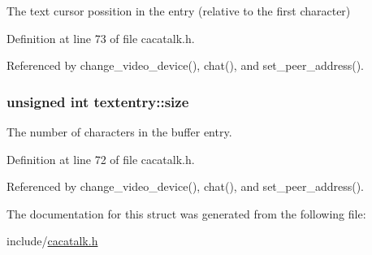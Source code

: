 \-The text cursor possition in the entry (relative to the first character) 



\-Definition at line 73 of file cacatalk.\-h.



\-Referenced by change\-\_\-video\-\_\-device(), chat(), and set\-\_\-peer\-\_\-address().

\hypertarget{structtextentry_a56e0baee961740d8bd5e0974e94af85a}{
\subsubsection[{size}]{\setlength{\rightskip}{0pt plus 5cm}unsigned int {\bf textentry\-::size}}}\label{structtextentry_a56e0baee961740d8bd5e0974e94af85a}


\-The number of characters in the buffer entry. 



\-Definition at line 72 of file cacatalk.\-h.



\-Referenced by change\-\_\-video\-\_\-device(), chat(), and set\-\_\-peer\-\_\-address().



\-The documentation for this struct was generated from the following file\-:\begin{DoxyCompactItemize}
\item 
include/\hyperlink{cacatalk_8h}{cacatalk.\-h}\end{DoxyCompactItemize}
